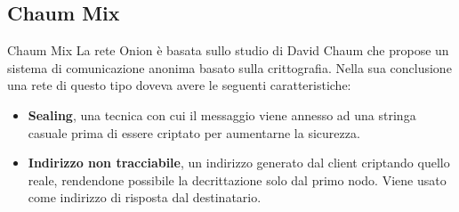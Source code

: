 \subsection{Chaum Mix}
\begin{frame}{Chaum Mix}
    La rete Onion è basata sullo studio di David Chaum che propose un sistema di comunicazione anonima basato sulla crittografia. Nella sua conclusione una rete di questo tipo doveva avere le seguenti caratteristiche:
    \begin{itemize}
        \item \textbf{Sealing}, una tecnica con cui il messaggio viene annesso ad una stringa casuale prima di essere criptato per aumentarne la sicurezza.
        \item \textbf{Indirizzo non tracciabile}, un indirizzo generato dal client criptando quello reale, rendendone possibile la decrittazione solo dal primo nodo. Viene usato come indirizzo di risposta dal destinatario.
    \end{itemize}
\end{frame}